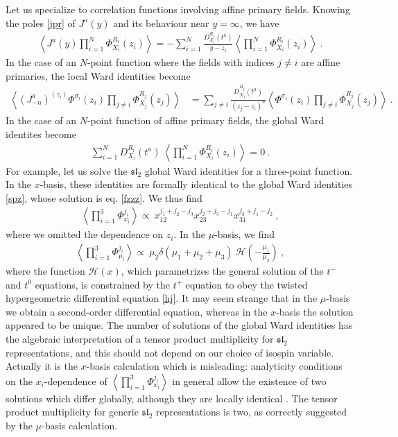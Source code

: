 \documentclass[12pt, a4paper, notitlepage, twoside]{report}
\numberwithin{equation}{section}
\theoremstyle{break}
\begin{document}
Let us specialize to correlation functions involving affine primary fields.
Knowing the poles \eqref{jpr} of $J^a(y)$ and its behaviour near $y=\infty$, we have
\begin{align}
 \left\langle J^a(y) \prod_{i=1}^N \Phi^{R_i}_{X_i}(z_i)\right\rangle = - \sum_{i=1}^N \frac{D^{R_i}_{X_i}(t^a)}{y-z_i}\left\langle \prod_{i=1}^N \Phi^{R_i}_{X_i}(z_i)\right\rangle\ .
\label{dja}
\end{align}
In the case of an $N$-point function where the fields with indices $j\neq i$ are affine primaries, the local Ward identities become
\begin{align}
\left\langle\left(J^a_{-n}\right)^{(z_i)}\Phi^{\sigma_i}(z_i)\prod_{j\neq i} \Phi^{R_j}_{X_j}(z_j)\right\rangle &=\sum_{j\neq i} \frac{D_{X_j}^{R_j}(t^a)}{(z_j-z_i)^n} \left\langle \Phi^{\sigma_i}(z_i)\prod_{j\neq i} \Phi^{R_j}_{X_j}(z_j)\right\rangle\ . 
\label{jmnz}
\end{align}
In the case of an $N$-point function of affine primary fields, the global Ward identites become
\begin{align}
 \sum_{i=1}^N D_{X_i}^{R_i}(t^a)\ \left\langle \prod_{i=1}^N \Phi^{R_i}_{X_i}(z_i)\right\rangle   = 0 \ .
\label{drxt}
\end{align}
For example, let us solve the $\mathfrak{sl}_2$ global Ward identities for a three-point function.
In the $x$-basis, these identities are formally identical to the global Ward identities \eqref{spz}, whose solution is eq. \eqref{fzzz}.
We thus find
\begin{align}
 \left\langle \prod_{i=1}^3 \Phi^{j_i}_{x_i} \right\rangle \propto\ x_{12}^{j_1+j_2-j_3} x_{23}^{j_2+j_3-j_1} x_{31}^{j_3+j_1-j_2}\ ,
\label{xxx}
\end{align}
where we omitted the dependence on $z_i$.
In the $\mu$-basis, we find 
\begin{align}
 \left\langle \prod_{i=1}^3\Phi^{j_i}_{\mu_i}\right\rangle \propto\ \mu_2\delta(\mu_1+\mu_2+\mu_3)\ \mathcal{H}\left(-\frac{\mu_1}{\mu_2}\right)\ ,
\label{pmf}
\end{align}
where the function $\mathcal{H}(x)$, which parametrizes the general solution of the $t^-$ and $t^0$ equations, is constrained by the $t^+$ equation to obey the twisted hypergeometric differential equation \eqref{hj}.
It may seem strange that in the $\mu$-basis we obtain a second-order differential equation, whereas in the $x$-basis the solution appeared to be unique.
The number of solutions of the global Ward identities has the algebraic interpretation of a tensor product multiplicity for $\mathfrak{sl}_2$ representations, and this should not depend on our choice of isospin variable.
Actually it is the $x$-basis calculation which is misleading: analyticity conditions on the $x_i$-dependence of $\left\langle \prod_{i=1}^3 \Phi^{j_i}_{x_i} \right\rangle$ in general allow the existence of two solutions which differ globally, although they are locally identical \cite{rib09}.
The tensor product multiplicity for generic $\mathfrak{sl}_2$ representations is two, as correctly suggested by the $\mu$-basis calculation. 
\end{document}
